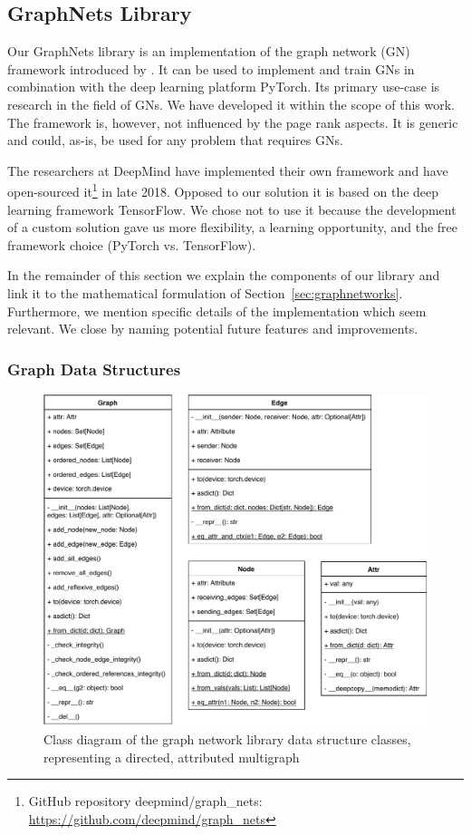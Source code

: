 \subsection{GraphNets Library}
\label{sec:gnlib}

Our GraphNets library is an implementation of the graph network (GN) framework introduced by \cite{deepmind:graphnets}. It can be used to implement and train GNs in combination with the deep learning platform PyTorch. Its primary use-case is research in the field of GNs. We have developed it within the scope of this work. The framework is, however, not influenced by the page rank aspects. It is generic and could, as-is, be used for any problem that requires GNs.

The researchers at DeepMind have implemented their own framework and have open-sourced it\footnote{GitHub repository deepmind/graph\_nets: \url{https://github.com/deepmind/graph_nets}} in late 2018. Opposed to our solution it is based on the deep learning framework TensorFlow. We chose not to use it because the development of a custom solution gave us more flexibility, a learning opportunity, and the free framework choice (PyTorch vs. TensorFlow).

In the remainder of this section we explain the components of our library and link it to the mathematical formulation of Section~\ref{sec:graphnetworks}. Furthermore, we mention specific details of the implementation which seem relevant. We close by naming potential future features and improvements.

\subsubsection{Graph Data Structures}

\begin{figure}\centering
    \includegraphics[scale=0.65]{resources/graphnets-datastructs}
    \caption[Class diagram of the graph network library data structure classes]{Class diagram of the graph network library data structure classes, representing a directed, attributed multigraph}\label{fig:classdiagramgndatastructs}
\end{figure}

